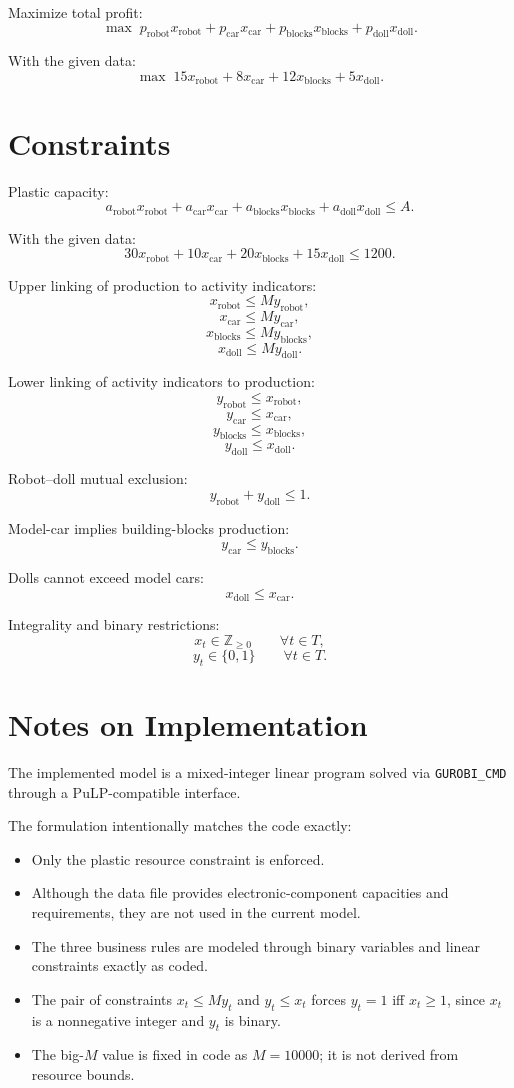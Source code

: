 Maximize total profit:
\[
\max \;
p_{\text{robot}}x_{\text{robot}}
+ p_{\text{car}}x_{\text{car}}
+ p_{\text{blocks}}x_{\text{blocks}}
+ p_{\text{doll}}x_{\text{doll}}.
\]

With the given data:
\[
\max \;
15x_{\text{robot}} + 8x_{\text{car}} + 12x_{\text{blocks}} + 5x_{\text{doll}}.
\]

\section*{Constraints}

Plastic capacity:
\[
a_{\text{robot}}x_{\text{robot}}
+ a_{\text{car}}x_{\text{car}}
+ a_{\text{blocks}}x_{\text{blocks}}
+ a_{\text{doll}}x_{\text{doll}}
\le A.
\]

With the given data:
\[
30x_{\text{robot}} + 10x_{\text{car}} + 20x_{\text{blocks}} + 15x_{\text{doll}} \le 1200.
\]

Upper linking of production to activity indicators:
\[
x_{\text{robot}} \le M y_{\text{robot}},
\]
\[
x_{\text{car}} \le M y_{\text{car}},
\]
\[
x_{\text{blocks}} \le M y_{\text{blocks}},
\]
\[
x_{\text{doll}} \le M y_{\text{doll}}.
\]

Lower linking of activity indicators to production:
\[
y_{\text{robot}} \le x_{\text{robot}},
\]
\[
y_{\text{car}} \le x_{\text{car}},
\]
\[
y_{\text{blocks}} \le x_{\text{blocks}},
\]
\[
y_{\text{doll}} \le x_{\text{doll}}.
\]

Robot--doll mutual exclusion:
\[
y_{\text{robot}} + y_{\text{doll}} \le 1.
\]

Model-car implies building-blocks production:
\[
y_{\text{car}} \le y_{\text{blocks}}.
\]

Dolls cannot exceed model cars:
\[
x_{\text{doll}} \le x_{\text{car}}.
\]

Integrality and binary restrictions:
\[
x_t \in \mathbb{Z}_{\ge 0} \qquad \forall t \in T,
\]
\[
y_t \in \{0,1\} \qquad \forall t \in T.
\]

\section*{Notes on Implementation}

The implemented model is a mixed-integer linear program solved via \texttt{GUROBI\_CMD} through a PuLP-compatible interface.

The formulation intentionally matches the code exactly:
\begin{itemize}
\item Only the plastic resource constraint is enforced.
\item Although the data file provides electronic-component capacities and requirements, they are not used in the current model.
\item The three business rules are modeled through binary variables and linear constraints exactly as coded.
\item The pair of constraints \(x_t \le M y_t\) and \(y_t \le x_t\) forces \(y_t=1\) iff \(x_t \ge 1\), since \(x_t\) is a nonnegative integer and \(y_t\) is binary.
\item The big-\(M\) value is fixed in code as \(M=10000\); it is not derived from resource bounds.
\end{itemize}
